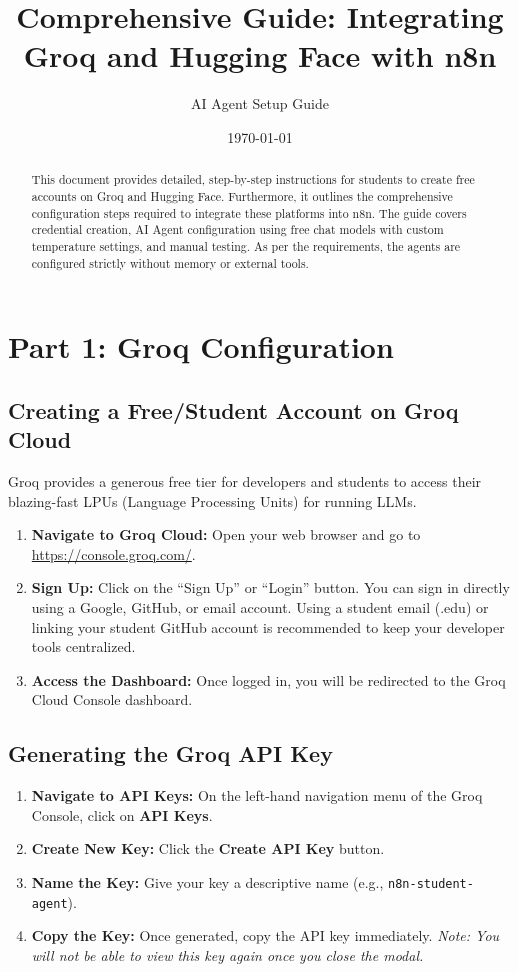 \documentclass[12pt,a4paper]{article}
\title{\textbf{Comprehensive Guide: Integrating Groq and Hugging Face with n8n}}
\author{AI Agent Setup Guide}
\date{\today}
\begin{document}
\maketitle

\begin{abstract}
This document provides detailed, step-by-step instructions for students to create free accounts on Groq and Hugging Face. Furthermore, it outlines the comprehensive configuration steps required to integrate these platforms into n8n. The guide covers credential creation, AI Agent configuration using free chat models with custom temperature settings, and manual testing. As per the requirements, the agents are configured strictly without memory or external tools.
\end{abstract}

\tableofcontents
\newpage

\section{Part 1: Groq Configuration}

\subsection{Creating a Free/Student Account on Groq Cloud}
Groq provides a generous free tier for developers and students to access their blazing-fast LPUs (Language Processing Units) for running LLMs.

\begin{enumerate}[label=\textbf{Step \arabic*.}]
    \item \textbf{Navigate to Groq Cloud:} Open your web browser and go to \url{https://console.groq.com/}.
    \item \textbf{Sign Up:} Click on the ``Sign Up'' or ``Login'' button. You can sign in directly using a Google, GitHub, or email account. Using a student email (.edu) or linking your student GitHub account is recommended to keep your developer tools centralized.
    \item \textbf{Access the Dashboard:} Once logged in, you will be redirected to the Groq Cloud Console dashboard.
\end{enumerate}

\subsection{Generating the Groq API Key}
\begin{enumerate}[label=\textbf{Step \arabic*.}]
    \item \textbf{Navigate to API Keys:} On the left-hand navigation menu of the Groq Console, click on \textbf{API Keys}.
    \item \textbf{Create New Key:} Click the \textbf{Create API Key} button.
    \item \textbf{Name the Key:} Give your key a descriptive name (e.g., \texttt{n8n-student-agent}).
    \item \textbf{Copy the Key:} Once generated, copy the API key immediately. \textit{Note: You will not be able to view this key again once you close the modal.}
\end{enumerate}
\end{document}
